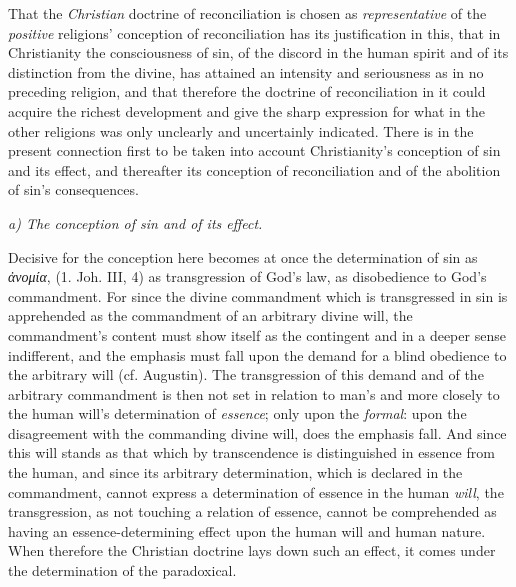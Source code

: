 \documentclass[12pt,a4paper]{book}
\begin{document}
That the \emph{Christian} doctrine of reconciliation is chosen as
\emph{representative} of the \emph{positive} religions' conception of
reconciliation has its justification in this, that in Christianity the
consciousness of sin, of the discord in the human spirit and of its distinction
from the divine, has attained an intensity and seriousness as in no preceding
religion, and that therefore the doctrine of reconciliation in it could acquire
the richest development and give the sharp expression for what in the other
religions was only unclearly and uncertainly indicated.
There is in the present connection first to be taken into account
Christianity's conception of sin and its effect, and thereafter its conception
of reconciliation and of the abolition of sin's consequences.

\begin{center}
\emph{a) The conception of sin and of its effect.}
\end{center}

Decisive for the conception here becomes at once the determination of sin as
\textit{ἀνομία}, (1. Joh. III, 4) as transgression of God's law, as disobedience
to God's commandment. For since the divine commandment which is transgressed in
sin is apprehended as the commandment of an arbitrary divine will, the
commandment's content must show itself as the contingent and in a deeper sense
indifferent, and the emphasis must fall upon the demand for a blind obedience to
the arbitrary will (cf. Augustin). The transgression of this demand and of the
arbitrary commandment is then not set in relation to man's and more closely to
the human will's determination of \emph{essence}; only upon the \emph{formal}:
upon the disagreement with the commanding divine will, does the emphasis fall.
And since this will stands as that which by transcendence is distinguished in
essence from the human, and since its arbitrary determination, which is declared
in the commandment, cannot express a determination of essence in the human
\emph{will}, the transgression, as not touching a relation of essence, cannot be
comprehended as having an essence-determining effect upon the human will and
human nature. When therefore the Christian doctrine lays down such an effect, it
comes under the determination of the paradoxical.
\end{document}
